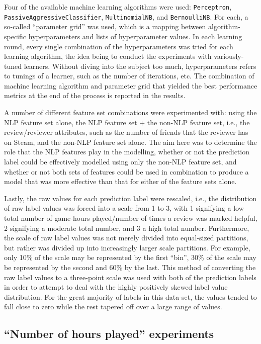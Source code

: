 \documentclass[9pt]{article}
\begin{document}
Four of the available machine learning algorithms were used: {\tt Perceptron}, {\tt PassiveAggressiveClassifier}, {\tt MultinomialNB}, and {\tt BernoulliNB}. For each, a so-called ``parameter grid'' was used, which is a mapping between algorithm-specific hyperparameters and lists of hyperparameter values. In each learning round, every single combination of the hyperparameters was tried for each learning algorithm, the idea being to conduct the experiments with variously-tuned learners. Without diving into the subject too much, hyperparameters refers to tunings of a learner, such as the number of iterations, etc. The combination of machine learning algorithm and parameter grid that yielded the best performance metrics at the end of the process is reported in the results.

A number of different feature set combinations were experimented with: using the NLP feature set alone, the NLP feature set + the non-NLP feature set, i.e., the review/reviewer attributes, such as the number of friends that the reviewer has on Steam, and the non-NLP feature set alone. The aim here was to determine the role that the NLP features play in the modelling, whether or not the prediction label could be effectively modelled using only the non-NLP feature set, and whether or not both sets of features could be used in combination to produce a model that was more effective than that for either of the feature sets alone.

Lastly, the raw values for each prediction label were rescaled, i.e., the distribution of raw label values was forced into a scale from 1 to 3, with 1 signifying a low total number of game-hours played/number of times a review was marked helpful, 2 signifying a moderate total number, and 3 a high total number. Furthermore, the scale of raw label values was not merely divided into equal-sized partitions, but rather was divided up into increasingly larger scale partitions. For example, only 10\% of the scale may be represented by the first ``bin'', 30\% of the scale may be represented by the second and 60\% by the last. This method of converting the raw label values to a three-point scale was used with both of the prediction labels in order to attempt to deal with the highly positively skewed label value distribution. For the great majority of labels in this data-set, the values tended to fall close to zero while the rest tapered off over a large range of values.

\subsection{``Number of hours played'' experiments}
\label{ssec:hours_played}
\end{document}
